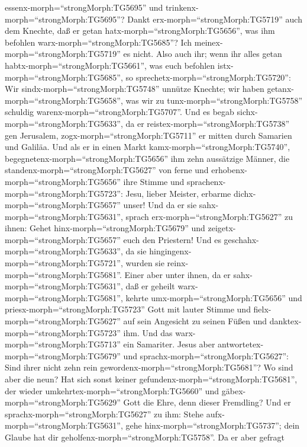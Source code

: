 essenx-morph=``strongMorph:TG5695'' und
trinkenx-morph=``strongMorph:TG5695''?  Dankt
erx-morph=``strongMorph:TG5719'' auch dem Knechte, daß er getan
hatx-morph=``strongMorph:TG5656'', was ihm befohlen
warx-morph=``strongMorph:TG5685''? Ich
meinex-morph=``strongMorph:TG5719'' es nicht.  Also auch
ihr; wenn ihr alles getan habtx-morph=``strongMorph:TG5661'', was euch
befohlen istx-morph=``strongMorph:TG5685'', so
sprechetx-morph=``strongMorph:TG5720'': Wir
sindx-morph=``strongMorph:TG5748'' unnütze Knechte; wir haben
getanx-morph=``strongMorph:TG5658'', was wir zu
tunx-morph=``strongMorph:TG5758'' schuldig
warenx-morph=``strongMorph:TG5707''.  Und es begab
sichx-morph=``strongMorph:TG5633'', da er
reistex-morph=``strongMorph:TG5738'' gen Jerusalem,
zogx-morph=``strongMorph:TG5711'' er mitten durch Samarien und Galiläa.
 Und als er in einen Markt
kamx-morph=``strongMorph:TG5740'',
begegnetenx-morph=``strongMorph:TG5656'' ihm zehn aussätzige Männer, die
standenx-morph=``strongMorph:TG5627'' von ferne  und
erhobenx-morph=``strongMorph:TG5656'' ihre Stimme und
sprachenx-morph=``strongMorph:TG5723'': Jesu, lieber Meister, erbarme
dichx-morph=``strongMorph:TG5657'' unser!  Und da er sie
sahx-morph=``strongMorph:TG5631'', sprach
erx-morph=``strongMorph:TG5627'' zu ihnen: Gehet
hinx-morph=``strongMorph:TG5679'' und
zeigetx-morph=``strongMorph:TG5657'' euch den Priestern! Und es
geschahx-morph=``strongMorph:TG5633'', da sie
hingingenx-morph=``strongMorph:TG5721'', wurden sie
reinx-morph=``strongMorph:TG5681''.  Einer aber unter
ihnen, da er sahx-morph=``strongMorph:TG5631'', daß er geheilt
warx-morph=``strongMorph:TG5681'', kehrte
umx-morph=``strongMorph:TG5656'' und priesx-morph=``strongMorph:TG5723''
Gott mit lauter Stimme  und
fielx-morph=``strongMorph:TG5627'' auf sein Angesicht zu seinen Füßen
und danktex-morph=``strongMorph:TG5723'' ihm. Und das
warx-morph=``strongMorph:TG5713'' ein Samariter.  Jesus
aber antwortetex-morph=``strongMorph:TG5679'' und
sprachx-morph=``strongMorph:TG5627'': Sind ihrer nicht zehn rein
gewordenx-morph=``strongMorph:TG5681''? Wo sind aber die neun?
 Hat sich sonst keiner
gefundenx-morph=``strongMorph:TG5681'', der wieder
umkehrtex-morph=``strongMorph:TG5660'' und
gäbex-morph=``strongMorph:TG5629'' Gott die Ehre, denn dieser Fremdling?
 Und er sprachx-morph=``strongMorph:TG5627'' zu ihm: Stehe
aufx-morph=``strongMorph:TG5631'', gehe
hinx-morph=``strongMorph:TG5737''; dein Glaube hat dir
geholfenx-morph=``strongMorph:TG5758''.  Da er aber gefragt

